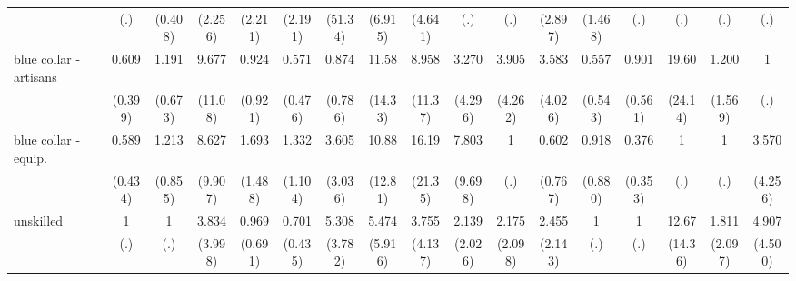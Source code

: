 {\begin{tabular}{l*{16}{c}}
                    &         (.)         &     (0.408)         &     (2.256)         &     (2.211)         &     (2.191)         &     (51.34)         &     (6.915)         &     (4.641)         &         (.)         &         (.)         &     (2.897)         &     (1.468)         &         (.)         &         (.)         &         (.)         &         (.)         \\
[1em]
blue collar - artisans&       0.609         &       1.191         &       9.677\sym{*}  &       0.924         &       0.571         &       0.874         &       11.58\sym{*}  &       8.958         &       3.270         &       3.905         &       3.583         &       0.557         &       0.901         &       19.60\sym{*}  &       1.200         &           1         \\
                    &     (0.399)         &     (0.673)         &     (11.08)         &     (0.921)         &     (0.476)         &     (0.786)         &     (14.33)         &     (11.37)         &     (4.296)         &     (4.262)         &     (4.026)         &     (0.543)         &     (0.561)         &     (24.14)         &     (1.569)         &         (.)         \\
[1em]
blue collar - equip.&       0.589         &       1.213         &       8.627         &       1.693         &       1.332         &       3.605         &       10.88\sym{*}  &       16.19\sym{*}  &       7.803         &           1         &       0.602         &       0.918         &       0.376         &           1         &           1         &       3.570         \\
                    &     (0.434)         &     (0.855)         &     (9.907)         &     (1.488)         &     (1.104)         &     (3.036)         &     (12.81)         &     (21.35)         &     (9.698)         &         (.)         &     (0.767)         &     (0.880)         &     (0.353)         &         (.)         &         (.)         &     (4.256)         \\
[1em]
unskilled           &           1         &           1         &       3.834         &       0.969         &       0.701         &       5.308\sym{*}  &       5.474         &       3.755         &       2.139         &       2.175         &       2.455         &           1         &           1         &       12.67\sym{*}  &       1.811         &       4.907         \\
                    &         (.)         &         (.)         &     (3.998)         &     (0.691)         &     (0.435)         &     (3.782)         &     (5.916)         &     (4.137)         &     (2.026)         &     (2.098)         &     (2.143)         &         (.)         &         (.)         &     (14.36)         &     (2.097)         &     (4.500)         \\

\end{tabular}}
